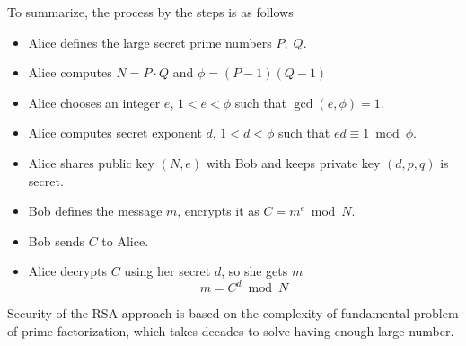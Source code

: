 \documentclass[12pt,letterpaper,oneside,reqno]{amsart}
\begin{document}
    To summarize, the process by the steps is as follows
    \begin{itemize}
        \item Alice defines the large secret prime numbers $P, \; Q$.
        \item Alice computes $N = P \cdot Q$ and $\phi = (P-1)(Q-1)$
        \item Alice chooses an integer $e$, $1<e< \phi$ such that $\gcd(e, \phi) = 1$.
        \item Alice computes secret exponent $d$, $1<d< \phi$ such that $ed \equiv 1 \bmod \phi$.
        \item Alice shares public key $(N,e)$ with Bob and keeps private key $(d, p, q)$ is secret.
        \item Bob defines the message $m$, encrypts it as $C = m^{e} \bmod N$.
        \item Bob sends $C$ to Alice.
        \item Alice decrypts $C$ using her secret $d$, so she gets $m$
        \[
            m = C^d \bmod N
        \]
    \end{itemize}
    Security of the RSA approach is based on the complexity of fundamental problem of prime factorization,
    which takes decades to solve having enough large number.

    
    
\end{document}
